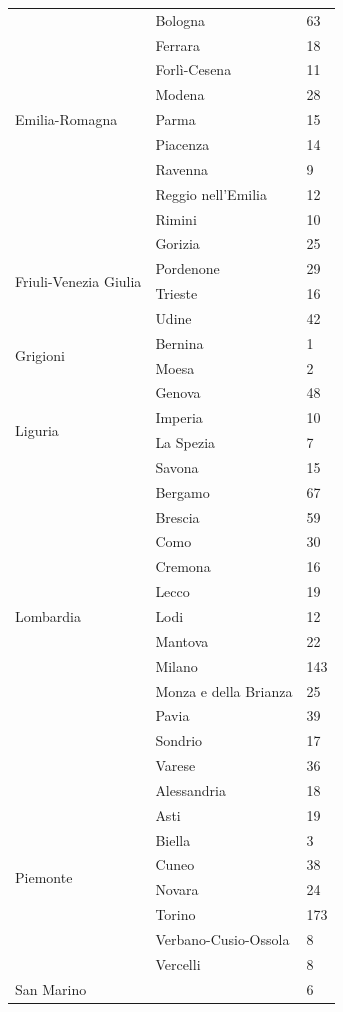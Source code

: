 \documentclass[a4paper,11pt]{article}
\begin{document}
\begin{longtable}{@{}lll@{}}
\multirow{9}{*}{Emilia-Romagna} & Bologna & 63 \\
 & Ferrara & 18 \\
 & Forlì-Cesena & 11 \\
 & Modena & 28 \\
 & Parma & 15 \\
 & Piacenza & 14 \\
 & Ravenna & 9 \\
 & Reggio nell'Emilia & 12 \\
 & Rimini & 10 \\\midrule
\multirow{4}{*}{Friuli-Venezia Giulia} & Gorizia & 25 \\
 & Pordenone & 29 \\
 & Trieste & 16 \\
 & Udine & 42 \\\midrule
\multirow{2}{*}{Grigioni} & Bernina & 1 \\
 & Moesa & 2 \\\midrule
\multirow{4}{*}{Liguria} & Genova & 48 \\
 & Imperia & 10 \\
 & La Spezia & 7 \\
 & Savona & 15 \\\midrule
\multirow{11}{*}{Lombardia} & Bergamo & 67 \\
 & Brescia & 59 \\
 & Como & 30 \\
 & Cremona & 16 \\
 & Lecco & 19 \\
 & Lodi & 12 \\
 & Mantova & 22 \\
 & Milano & 143 \\
 & Monza e della Brianza & 25 \\
 & Pavia & 39 \\
 & Sondrio & 17 \\
 & Varese & 36 \\\midrule
\multirow{8}{*}{Piemonte} & Alessandria & 18 \\
 & Asti & 19 \\
 & Biella & 3 \\
 & Cuneo & 38 \\
 & Novara & 24 \\
 & Torino & 173 \\
 & Verbano-Cusio-Ossola & 8 \\
 & Vercelli & 8 \\\midrule
San Marino &  & 6 \\\midrule

\end{longtable}
\end{document}
